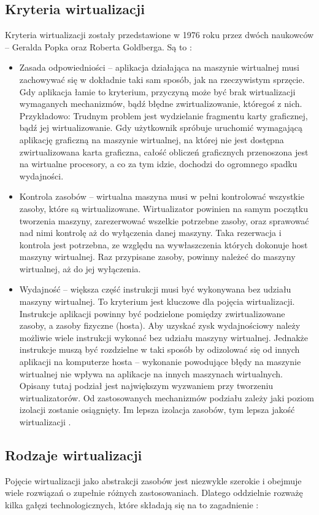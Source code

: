 \documentclass[10pt,a4paper,titlepage,twoside]{report}
\begin{document}
\subsection{Kryteria wirtualizacji}\indent \indent Kryteria wirtualizacji zostały przedstawione w 1976 roku przez dwóch naukowców – Geralda Popka oraz Roberta Goldberga. Są to \cite{ad15}:
\begin{itemize}
	\item Zasada odpowiedniości – aplikacja działająca na maszynie wirtualnej musi zachowywać się w dokładnie taki sam sposób, jak na rzeczywistym sprzęcie.
Gdy aplikacja łamie to kryterium, przyczyną może być brak wirtualizacji wymaganych mechanizmów, bądź błędne zwirtualizowanie, któregoś z nich. Przykładowo: Trudnym problem jest wydzielanie fragmentu karty graficznej, bądź jej wirtualizowanie. Gdy użytkownik spróbuje uruchomić wymagającą aplikację graficzną na maszynie wirtualnej, na której nie jest dostępna zwirtualizowana karta graficzna, całość obliczeń graficznych przenoszona jest na wirtualne procesory, a co za tym idzie, dochodzi do ogromnego spadku wydajności.
	\item Kontrola zasobów – wirtualna maszyna musi w pełni kontrolować wszystkie zasoby, które są wirtualizowane. Wirtualizator powinien na samym początku tworzenia maszyny, zarezerwować wszelkie potrzebne zasoby, oraz sprawować nad nimi kontrolę aż do wyłączenia danej maszyny. Taka rezerwacja i kontrola jest potrzebna, ze względu na wywłaszczenia których dokonuje host maszyny wirtualnej. Raz przypisane zasoby, powinny należeć do maszyny wirtualnej, aż do jej wyłączenia.
	\item Wydajność – większa część instrukcji musi być wykonywana bez udziału maszyny wirtualnej.
To kryterium jest kluczowe dla pojęcia wirtualizacji. Instrukcje aplikacji powinny być podzielone pomiędzy zwirtualizowane zasoby, a zasoby fizyczne (hosta). Aby uzyskać zysk wydajnościowy należy możliwie wiele instrukcji wykonać bez udziału maszyny wirtualnej. Jednakże instrukcje muszą być rozdzielne w taki sposób by odizolować się od innych aplikacji na komputerze hosta – wykonanie powodujące błędy na maszynie wirtualnej nie wpływa na aplikacje na innych maszynach wirtualnych. Opisany tutaj podział jest największym wyzwaniem przy tworzeniu wirtualizatorów. Od zastosowanych mechanizmów podziału zależy jaki poziom izolacji zostanie osiągnięty. Im lepsza izolacja zasobów, tym lepsza jakość wirtualizacji \cite{ad17}.
\end{itemize}

\subsection{Rodzaje wirtualizacji}\indent \indent Pojęcie wirtualizacji jako abstrakcji zasobów jest niezwykle szerokie i obejmuje wiele rozwiązań o zupełnie różnych zastosowaniach. Dlatego oddzielnie rozważę kilka gałęzi technologicznych, które składają się na to zagadnienie \cite{ad15}\cite{ad18}:
\end{document}
